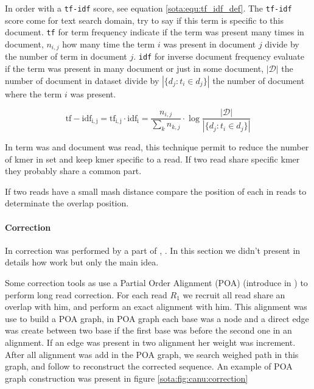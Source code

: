 \documentclass[main]{subfiles}
\begin{document}
In \mhap order \kmer with a \texttt{tf-idf} score, see equation \ref{sota:equ:tf_idf_def}. The \texttt{tf-idf} score come for text search domain, try to say if this term is specific to this document. \texttt{tf} for term frequency indicate if the term was present many times in document, $n_{i,j}$ how many time the term $i$ was present in document $j$ divide by the number of term in document $j$. \texttt{idf} for inverse document frequency evaluate if the term was present in many document or just in some document, $|\mathcal{D}|$ the number of document in dataset divide by $|\{d_{j}:t_{i}\in d_{j}\}|$ the number of document where the term $i$ was present.

\begin{equation}
\mathrm{tf-idf_{i,j}} = \mathrm{tf_{i,j}} \cdot \mathrm{idf_{i}} = \frac{n_{i,j}}{\sum_{k}n_{k,j}} \cdot \log{\frac  {|\mathcal{D}|}{|\{d_{j}:t_{i}\in d_{j}\}|}}
\label{sota:equ:tf_idf_def}
\end{equation}

In \mhap term was \kmer and document was read, this technique permit to reduce the number of kmer in set and keep kmer specific to a read. If two read share specific kmer they probably share a common part.

If two reads have a small mash distance \mhap compare the position of each \kmer in reads to determinate the overlap position.

\paragraph{Correction}

In \canu correction was performed by a part of  \cite{falcon}, . In this section we didn't present in details how  work but only the main idea.

Some correction tools as  use a Partial Order Alignment (POA) (introduce in \cite{poa}) to perform long read correction. For each read \texttt{$R_1$} we recruit all read share an overlap with him, and perform an exact alignment with him. This alignment was use to build a POA graph, in POA graph each base was a node and a direct edge was create between two base if the first base was before the second one in an alignment. If an edge was present in two alignment her weight was increment. After all alignment was add in the POA graph, we search weighed path in this graph, and follow to reconstruct the corrected sequence. An example of POA graph construction was present in figure \ref{sota:fig:canu:correction}
\end{document}
